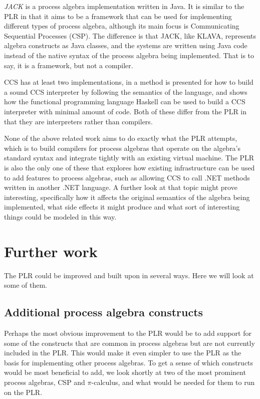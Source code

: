 	\textit{JACK} \cite{jack} is a process algebra implementation written in 
	Java. It is similar to the PLR in that it aims to be a framework that can be
	used for implementing different types of process algebra, although its main
	focus is Communicating Sequential Processes (CSP). The difference is that 
	JACK, like KLAVA, represents algebra constructs as Java classes, and the  
	systems are written using Java code instead of the native syntax of the 
	process algebra being implemented. That is to say, it is a framework, but 
	not a compiler.
	
	CCS has at least two implementations, in \cite{build_ccs_interpreter} a 
	method is presented for how to build a sound CCS interpreter by following 
	the semantics of the language, and \cite{ccs_interpreter} shows how the 
	functional programming language Haskell can be used to build a CCS 
	interpreter with minimal amount of code. Both of these differ from the PLR 
	in that they are interpreters rather than compilers.
	
	None of the above related work aims to do exactly what the PLR attempts, 
	which is to build compilers for process algebras that operate on the 		
	algebra's standard syntax and integrate tightly with an existing virtual 
	machine. The PLR is also the only one of these that explores how existing 
	infrastructure can be used to add features to process algebras, such as 
	allowing CCS to call .NET methods written in another .NET language. A 
	further look at that topic might prove interesting, specifically how it 
	affects the original semantics of the algebra being implemented, what side 
	effects it might produce and what sort of interesting things could be
	modeled in this way.

\section{Further work}
\label{sec:further}

	The PLR could be improved and built upon in several ways. Here we will look 
	at some of them.
	
	\subsection{Additional process algebra constructs}
	
	Perhaps the most obvious improvement to the PLR would be to add support for 
	some of the constructs that are common in process algebras but are not 
	currently included in the PLR. This would make it even simpler to use the 
	PLR as the basis for implementing other process algebras. To get a sense of 
	which constructs would be most beneficial to add, we look shortly at two
	of the most prominent process algebras, CSP and $\pi$-calculus, and 
	what would be needed for them to run on the PLR.
	
